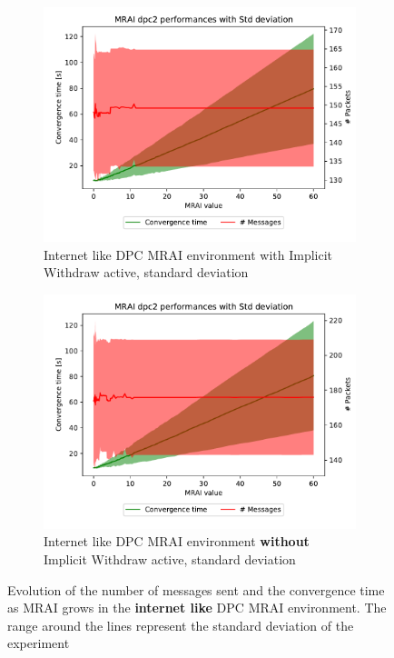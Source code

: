 \documentclass[10pt,conference,letterpaper]{IEEEtran}
\newcommand{\figwidth}{0.78}
\newcommand{\figvspace}{-1.5em}
\begin{document}
\begin{figure}[tb]
	\centering

	\begin{subfigure}{\columnwidth}
		\centering
		\includegraphics[width=\figwidth\columnwidth]{images/internet_like/graph-100-dpc/mrai_evolution_std_alpha}
		\caption{Internet like \ac{DPC} \ac{MRAI} environment with Implicit Withdraw active, standard deviation}
		\label{fig:dpc_mrai_evolution_IW_std}
		\qquad
	\end{subfigure}

	\begin{subfigure}{\columnwidth}
		\centering
		\includegraphics[width=\figwidth\columnwidth]{images/internet_like/graph-100-dpc-noIW/mrai_evolution_std_alpha}
		\caption{Internet like \ac{DPC} \ac{MRAI} environment \textbf{without} Implicit Withdraw active, standard deviation}
		\label{fig:dpc_mrai_evolution_noIW_std}
		\qquad
	\end{subfigure}

	\caption{Evolution of the number of messages sent and the convergence time as \ac{MRAI} grows
		in the \textbf{internet like} \ac{DPC} \ac{MRAI} environment. The range around the lines
		represent the standard deviation of the experiment
		}
	\label{fig:dpc_mrai_evolution_std}
	\vspace{\figvspace}
\end{figure}
\end{document}
